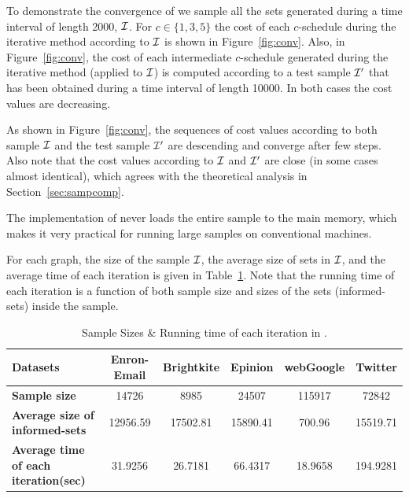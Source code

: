 To demonstrate the convergence of \algonameapx we sample all the sets generated during
a time interval of length 2000, $\mathcal{I}$. For $c\in\{1,3,5\}$ the cost of each $c$-schedule during the iterative method according to $\mathcal{I}$ is shown in Figure~\ref{fig:conv}. Also, in Figure~\ref{fig:conv}, the cost of each intermediate $c$-schedule generated during the iterative method (applied to $\mathcal{I}$) is computed according to a test sample $\mathcal{I}'$ that has been obtained during a time interval of length 10000. In both cases the cost values are decreasing. 



As shown in Figure~\ref{fig:conv}, the sequences of cost values according to both sample $\mathcal{I}$ and the test sample $\mathcal{I}'$ are descending and converge after few steps. Also note that the cost values according to $\mathcal{I}$ and $\mathcal{I}'$ are close (in some cases almost identical), which agrees with the theoretical analysis in Section~\ref{sec:sampcomp}.






\begin{remark}
The implementation of \algonameapx never loads the entire sample to the main memory, which makes it very practical for running large samples on conventional machines.
\end{remark}



For each graph, the size of the sample $\mathcal{I}$, the average size of sets in $\mathcal{I}$, and the average time of each iteration is given in Table~\ref{table:time}. Note that the running time of each iteration is a function of both sample size and sizes of the sets (informed-sets) inside the sample.

\begin{table}[h]
\begin{tabular}{|l|c|c|c|c|c|}
\hline
{\bf Datasets}& Enron-Email & Brightkite & Epinion  & webGoogle & Twitter\\
\hline \hline
{\bf Sample size}& 14726 & 8985 & 24507 & 115917 & 72842 \\
\hline
{\bf Average size of informed-sets}& 12956.59 & 17502.81 & 15890.41 & 700.96  & 15519.71 \\
\hline
{\bf Average time of each iteration(sec)}& 31.9256 & 26.7181&  66.4317&  18.9658&  194.9281\\
\hline
\end{tabular}
\caption{Sample Sizes \& Running time of each iteration in \algonameapx.}\label{table:time}
\end{table}

